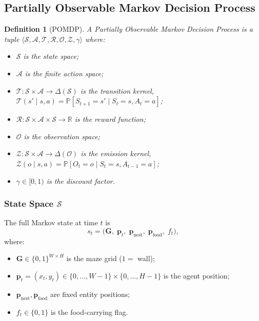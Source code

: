 \documentclass[11pt,a4paper]{article}
\newtheorem{definition}[theorem]{Definition}
\newcommand{\R}{\mathbb{R}}
\newcommand{\Prob}{\mathbb{P}}
\newcommand{\cS}{\mathcal{S}}
\newcommand{\cA}{\mathcal{A}}
\newcommand{\cO}{\mathcal{O}}
\newcommand{\cT}{\mathcal{T}}
\newcommand{\cR}{\mathcal{R}}
\newcommand{\cZ}{\mathcal{Z}}
\begin{document}
\subsection{Partially Observable Markov Decision Process}

\begin{definition}[POMDP]
A \emph{Partially Observable Markov Decision Process} is a tuple
$\langle \cS, \cA, \cT, \cR, \cO, \cZ, \gamma \rangle$ where:
\begin{itemize}
  \item $\cS$ is the state space;
  \item $\cA$ is the finite action space;
  \item $\cT : \cS \times \cA \to \Delta(\cS)$ is the transition kernel,
        $\cT(s' \mid s, a) = \Prob[S_{t+1} = s' \mid S_t = s, A_t = a]$;
  \item $\cR : \cS \times \cA \times \cS \to \R$ is the reward function;
  \item $\cO$ is the observation space;
  \item $\cZ : \cS \times \cA \to \Delta(\cO)$ is the emission kernel,
        $\cZ(o \mid s, a) = \Prob[O_t = o \mid S_t = s, A_{t-1} = a]$;
  \item $\gamma \in [0,1)$ is the discount factor.
\end{itemize}
\end{definition}

\subsubsection{State Space $\cS$}

The full Markov state at time $t$ is
\begin{equation}
  s_t = \bigl(\mathbf{G},\; \mathbf{p}_t,\; \mathbf{p}_{\text{nest}},\;
              \mathbf{p}_{\text{food}},\; f_t\bigr),
\end{equation}
where:
\begin{itemize}
  \item $\mathbf{G} \in \{0,1\}^{W \times H}$ is the maze grid ($1 = $ wall);
  \item $\mathbf{p}_t = (x_t, y_t) \in \{0,\ldots,W{-}1\} \times \{0,\ldots,H{-}1\}$ is the agent position;
  \item $\mathbf{p}_{\text{nest}}, \mathbf{p}_{\text{food}}$ are fixed entity positions;
  \item $f_t \in \{0,1\}$ is the food-carrying flag.
\end{itemize}
\end{document}
